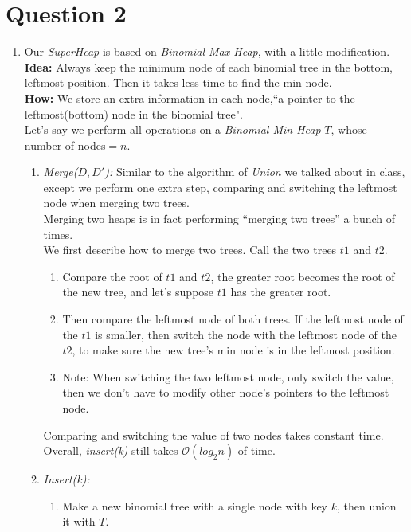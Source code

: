 \documentclass[10pt]{article}
\begin{document}
\section*{Question 2}
\begin{enumerate}
\item
Our \textit{SuperHeap} is based on \textit{Binomial Max Heap}, with a little modification.\\
\textbf{Idea:} Always keep the minimum node of each binomial tree in the bottom, leftmost position. Then it takes less time to find the min node.\\
\textbf{How:} We store an extra information in each node,``a pointer to the leftmost(bottom) node in the binomial tree".\\
Let's say we perform all operations on a \textit{Binomial Min Heap} $T$, whose number of nodes$=n$.
\begin{enumerate}
\item \textit{Merge($D, D'$):}
Similar to the algorithm of \textit{Union} we talked about in class, except we perform one extra step, comparing and switching the leftmost node when merging two trees.\\
Merging two heaps is in fact performing ``merging two trees'' a bunch of times. \\
We first describe how to merge two trees. Call the two trees $t1$ and $t2$.
\begin{enumerate}
\item Compare the root of $t1$ and $t2$, the greater root becomes the root of the new tree, and let's suppose $t1$ has the greater root.
\item Then compare the leftmost node of both trees. If the leftmost node of the $t1$ is smaller, then switch the node with the leftmost node of the $t2$, to make sure the new tree's min node is in the leftmost position.
\item Note: When switching the two leftmost node, only switch the value, then we don't have to modify other node's pointers to the leftmost node.
\end{enumerate}
Comparing and switching the value of two nodes takes constant time. Overall, \textit{insert(k)} still takes $\mathcal{O}(log_2n)$ of time.
\item \textit{Insert(k):} 
\begin{enumerate}
\item Make a new binomial tree with a single node with key $k$, then union it with $T$. 


\end{enumerate}
\end{enumerate}
\end{enumerate}
\end{document}
